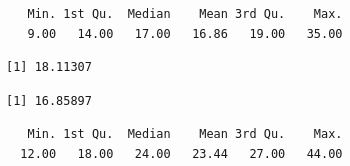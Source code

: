 \documentclass[
  letterpaper,
  DIV=11,
  numbers=noendperiod]{scrreprt}
\newenvironment{Shaded}{\begin{snugshade}}{\end{snugshade}}
\newcommand{\CommentTok}[1]{\textcolor[rgb]{0.37,0.37,0.37}{#1}}
\newcommand{\FunctionTok}[1]{\textcolor[rgb]{0.28,0.35,0.67}{#1}}
\newcommand{\NormalTok}[1]{\textcolor[rgb]{0.00,0.23,0.31}{#1}}
\newcommand{\SpecialCharTok}[1]{\textcolor[rgb]{0.37,0.37,0.37}{#1}}
\begin{document}
\begin{Shaded}
\end{Shaded}

\begin{verbatim}
   Min. 1st Qu.  Median    Mean 3rd Qu.    Max. 
   9.00   14.00   17.00   16.86   19.00   35.00 
\end{verbatim}

\begin{Shaded}
\end{Shaded}

\begin{verbatim}
[1] 18.11307
\end{verbatim}

\begin{Shaded}
\end{Shaded}

\begin{verbatim}
[1] 16.85897
\end{verbatim}

\begin{Shaded}
\end{Shaded}

\begin{verbatim}
   Min. 1st Qu.  Median    Mean 3rd Qu.    Max. 
  12.00   18.00   24.00   23.44   27.00   44.00 
\end{verbatim}

\begin{Shaded}
\end{Shaded}
\end{document}
